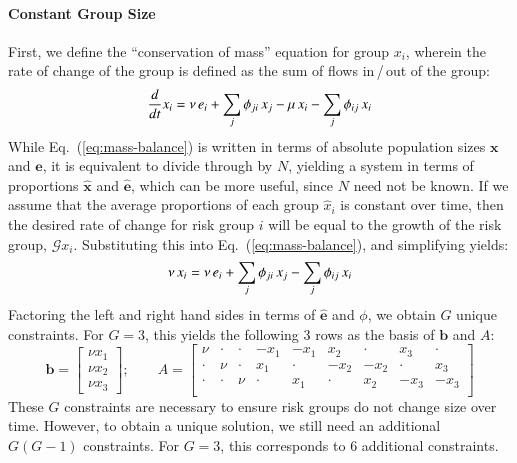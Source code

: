 \paragraph{Constant Group Size}
First, we define the ``conservation of mass'' equation for group $x_i$,
wherein the rate of change of the group
is defined as the sum of flows in\,/\,out of the group:
\begin{equation}\label{eq:mass-balance}
\frac{d}{dt}x_i
= \nu \thinspace e_i + \sum_{j}{\phi_{ji} \thinspace x_j}
- \mu \thinspace x_i - \sum_{j}{\phi_{ij} \thinspace x_i}
\end{equation}
While Eq.~(\ref{eq:mass-balance}) is written in terms of
absolute population sizes $\bm{x}$ and $\bm{e}$,
it is equivalent to divide through by $N$,
yielding a system in terms of
proportions $\bm{\hat{x}}$ and $\bm{\hat{e}}$,
which can be more useful, since $N$ need not be known.
If we assume that the average proportions of each group $\hat{x}_i$ is constant over time,
then the desired rate of change for risk group $i$
will be equal to the growth of the risk group, $\mathcal{G} x_i$.
Substituting this into Eq.~(\ref{eq:mass-balance}),
and simplifying yields:
\begin{equation}\label{eq:system}
\nu \thinspace x_i
= \nu \thinspace e_i + \sum_{j}{\phi_{ji} \thinspace x_j}
- \sum_{j}{\phi_{ij} \thinspace x_i}
\end{equation}
Factoring the left and right hand sides in terms of $\bm{\hat{e}}$ and $\phi$,
we obtain $G$ unique constraints.
For $G = 3$, this yields the following 3 rows as the basis of $\bm{b}$ and $A$:
\begin{equation}\label{eq:b-A-basis}
\bm{b} = \left[\begin{array}{c}
\nu x_1 \\ \nu x_2 \\ \nu x_3
\end{array}\right];\qquad
A = \left[\begin{array}{ccccccccc}
 \nu  & \cdot & \cdot & -x_1  & -x_1  &  x_2  & \cdot &  x_3  & \cdot \\
\cdot &  \nu  & \cdot &  x_1  & \cdot & -x_2  & -x_2  & \cdot &  x_3  \\
\cdot & \cdot &  \nu  & \cdot &  x_1  & \cdot &  x_2  & -x_3  & -x_3  \\
\end{array}\right] 
\end{equation}
These $G$ constraints are necessary to ensure risk groups do not change size over time.
However, to obtain a unique solution,
we still need an additional $G(G-1)$ constraints.
For $G = 3$, this corresponds to 6 additional constraints.

